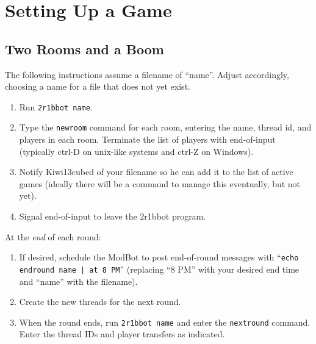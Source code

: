 \documentclass{report}
\begin{document}
\appendix
\chapter{Setting Up a Game}
\section{Two Rooms and a Boom}
The following instructions assume a filename of ``name''. Adjust accordingly, choosing a name for a file that does not yet exist.
\begin{enumerate}
\item Run \texttt{2r1bbot name}.
\item Type the \texttt{newroom} command for each room, entering the name, thread id, and players in each room. Terminate the list of players with end-of-input (typically ctrl-D on unix-like systems and ctrl-Z on Windows).
\item Notify Kiwi13cubed of your filename so he can add it to the list of active games (ideally there will be a command to manage this eventually, but not yet).
\item Signal end-of-input to leave the 2r1bbot program.
\end{enumerate}
At the \emph{end} of each round:
\begin{enumerate}
\item If desired, schedule the ModBot to post end-of-round messages with ``\texttt{echo \textquotedbl endround name\textquotedbl\ | at 8 PM}'' (replacing ``8 PM'' with your desired end time and ``name'' with the filename).
\item Create the new threads for the next round.
\item When the round ends, run \texttt{2r1bbot name} and enter the \texttt{nextround} command. Enter the thread IDs and player transfers as indicated.
\end{enumerate}
\end{document}
